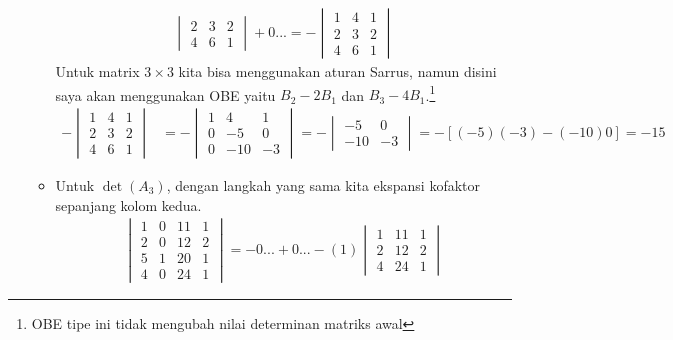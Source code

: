 \documentclass[10pt,openany,a4paper]{article}
\begin{document}
\begin{enumerate}
\begin{itemize}
\begin{align*}
\begin{vmatrix}
                    2 & 3 & 2\\
                    4 & 6 & 1
                \end{vmatrix}+0...=-\begin{vmatrix}
                    1 & 4 & 1\\
                    2 & 3 & 2\\
                    4 & 6 & 1
                \end{vmatrix}
            \end{align*}
            Untuk matrix $3\times 3$ kita bisa menggunakan aturan Sarrus, namun disini saya akan menggunakan OBE yaitu $B_2-2B_1$ dan $B_3-4B_1$.\footnote{OBE tipe ini tidak mengubah nilai determinan matriks awal}
            \begin{align*}
                -\begin{vmatrix}
                    1 & 4 & 1\\
                    2 & 3 & 2\\
                    4 & 6 & 1
                \end{vmatrix}&=-\begin{vmatrix}
                    1 & 4 & 1\\
                    0 & -5 & 0\\
                    0 & -10 & -3
                \end{vmatrix}=-\begin{vmatrix}
                    -5 & 0\\
                    -10 & -3
                \end{vmatrix}=-[(-5)(-3)-(-10)0]=-15
            \end{align*}
            \item Untuk $\det(A_3)$, dengan langkah yang sama kita ekspansi kofaktor sepanjang kolom kedua.
            \begin{align*}
                \begin{vmatrix}
                    1 & 0 & 11 & 1\\
                    2 & 0 & 12 & 2\\
                    5 & 1 & 20 & 1\\
                    4 & 0 & 24 & 1
                \end{vmatrix}=-0...+0...-(1)\begin{vmatrix}
                    1 & 11 & 1\\
                    2 & 12 & 2\\
                    4 & 24 & 1

\end{vmatrix}
\end{align*}
\end{itemize}
\end{enumerate}
\end{document}
